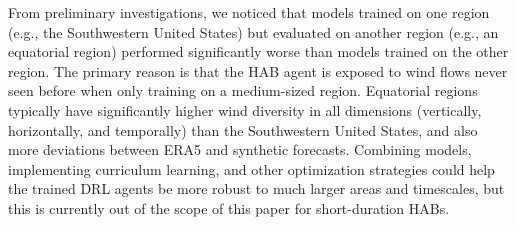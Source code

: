 From preliminary investigations, we noticed that models trained on one region (e.g., the Southwestern United States) but evaluated on another region (e.g., an equatorial region) performed significantly worse than models trained on the other region.  The primary reason is that the HAB agent is exposed to wind flows never seen before when only training on a medium-sized region. Equatorial regions typically have significantly higher wind diversity in all dimensions (vertically, horizontally, and temporally) than the Southwestern United States, and also more deviations between ERA5 and synthetic forecasts.  Combining models, implementing curriculum learning, and other optimization strategies could help the trained DRL agents be more robust to much larger areas and timescales, but this is currently out of the scope of this paper for short-duration HABs. 
















